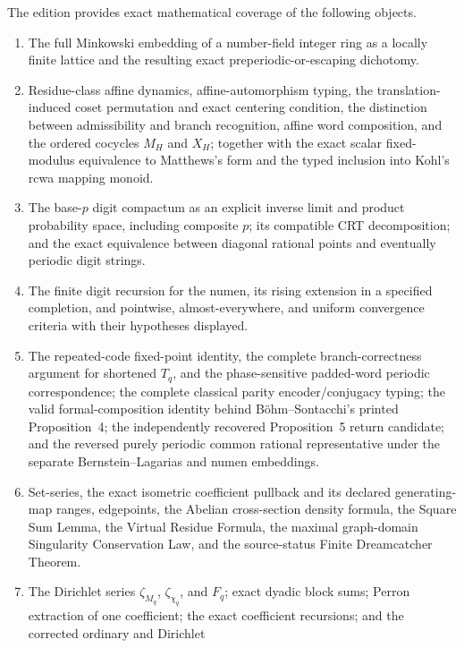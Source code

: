 The edition provides exact mathematical coverage of the following objects.
\begin{enumerate}[label=\textup{(\arabic*)}]
\item The full Minkowski embedding of a number-field integer ring as a locally
      finite lattice and the resulting exact preperiodic-or-escaping
      dichotomy.
\item Residue-class affine dynamics, affine-automorphism typing, the
      translation-induced coset permutation and exact centering condition,
      the distinction between admissibility and branch recognition, affine
      word composition, and the ordered cocycles $M_H$ and $X_H$; together
      with the exact scalar fixed-modulus equivalence to Matthews's form and
      the typed inclusion into Kohl's rcwa mapping monoid.
\item The base-$p$ digit compactum as an explicit inverse limit and product
      probability space, including composite $p$; its compatible CRT
      decomposition; and the exact equivalence between diagonal rational
      points and eventually periodic digit strings.
\item The finite digit recursion for the numen, its rising extension in a
      specified completion, and pointwise, almost-everywhere, and uniform
      convergence criteria with their hypotheses displayed.
\item The repeated-code fixed-point identity, the complete branch-correctness
      argument for shortened $T_q$, and the phase-sensitive padded-word
      periodic correspondence; the complete classical parity
      encoder/conjugacy typing; the valid formal-composition identity behind
      B\"ohm--Sontacchi's printed Proposition~4; the independently recovered
      Proposition~5 return candidate; and the reversed purely periodic common
      rational representative under the separate Bernstein--Lagarias and
      numen embeddings.
\item Set-series, the exact isometric coefficient pullback and its declared
      generating-map ranges, edgepoints, the Abelian cross-section density
      formula, the Square Sum Lemma, the Virtual Residue Formula, the maximal
      graph-domain Singularity Conservation Law, and the source-status Finite
      Dreamcatcher Theorem.
\item The Dirichlet series $\zeta_{M_q}$, $\zeta_{\chi_q}$, and $F_q$; exact
      dyadic block sums; Perron extraction of one coefficient; the exact
      coefficient recursions; and the corrected ordinary and Dirichlet

\end{enumerate}
